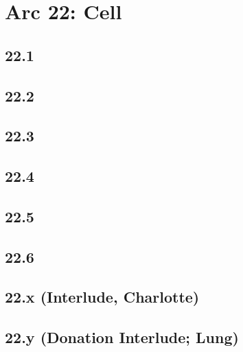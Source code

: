 \part{Arc 22: Cell}
 \chapter{22.1}
 \chapter{22.2}
 \chapter{22.3}
 \chapter{22.4}
 \chapter{22.5}
 \chapter{22.6}
 \chapter{22.x (Interlude, Charlotte)}
 \chapter{22.y (Donation Interlude; Lung)}









